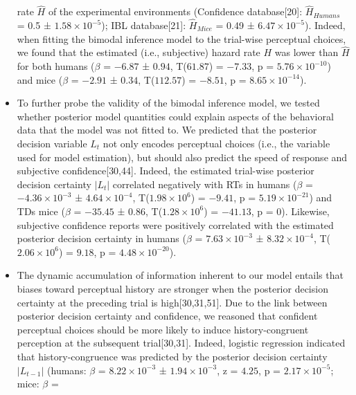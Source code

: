 \documentclass[
]{article}
\begin{document}
\begin{itemize}
  rate \(\hat{H}\) of the experimental environments (Confidence
  database{[}20{]}: \(\hat{H}_{Humans}\) = 0.5 ±
  \ensuremath{1.58\times 10^{-5}}); IBL database{[}21{]}:
  \(\hat{H}_{Mice}\) = 0.49 ± \ensuremath{6.47\times 10^{-5}}). Indeed,
  when fitting the bimodal inference model to the trial-wise perceptual
  choices, we found that the estimated (i.e., subjective) hazard rate
  \(H\) was lower than \(\hat{H}\) for both humans (\(\beta\) =
  \(-6.87\) ± \(0.94\), T(\(61.87\)) = \(-7.33\), p =
  \(\ensuremath{5.76\times 10^{-10}}\)) and mice (\(\beta\) = \(-2.91\)
  ± \(0.34\), T(\(112.57\)) = \(-8.51\), p =
  \(\ensuremath{8.65\times 10^{-14}}\)).
\item
  To further probe the validity of the bimodal inference model, we
  tested whether posterior model quantities could explain aspects of the
  behavioral data that the model was not fitted to. We predicted that
  the posterior decision variable \(L_t\) not only encodes perceptual
  choices (i.e., the variable used for model estimation), but should
  also predict the speed of response and subjective
  confidence{[}30,44{]}. Indeed, the estimated trial-wise posterior
  decision certainty \(|L_t|\) correlated negatively with RTs in humans
  (\(\beta\) = \(\ensuremath{-4.36\times 10^{-3}}\) ±
  \(\ensuremath{4.64\times 10^{-4}}\),
  T(\(\ensuremath{1.98\times 10^{6}}\)) = \(-9.41\), p =
  \(\ensuremath{5.19\times 10^{-21}}\)) and TDs mice (\(\beta\) =
  \(-35.45\) ± \(0.86\), T(\(\ensuremath{1.28\times 10^{6}}\)) =
  \(-41.13\), p = \(0\)). Likewise, subjective confidence reports were
  positively correlated with the estimated posterior decision certainty
  in humans (\(\beta\) = \(\ensuremath{7.63\times 10^{-3}}\) ±
  \(\ensuremath{8.32\times 10^{-4}}\),
  T(\(\ensuremath{2.06\times 10^{6}}\)) = \(9.18\), p =
  \(\ensuremath{4.48\times 10^{-20}}\)).
\item
  The dynamic accumulation of information inherent to our model entails
  that biases toward perceptual history are stronger when the posterior
  decision certainty at the preceding trial is high{[}30,31,51{]}. Due
  to the link between posterior decision certainty and confidence, we
  reasoned that confident perceptual choices should be more likely to
  induce history-congruent perception at the subsequent
  trial{[}30,31{]}. Indeed, logistic regression indicated that
  history-congruence was predicted by the posterior decision certainty
  \(|L_{t-1}|\) (humans: \(\beta\) = \(\ensuremath{8.22\times 10^{-3}}\)
  ± \(\ensuremath{1.94\times 10^{-3}}\), z = \(4.25\), p =
  \(\ensuremath{2.17\times 10^{-5}}\); mice: \(\beta\) =

\end{itemize}
\end{document}
